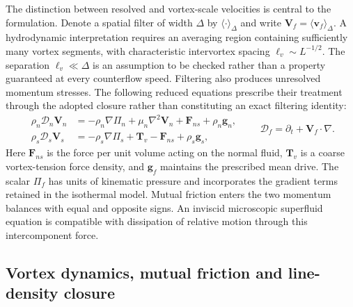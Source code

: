 \documentclass[11pt]{article}
\numberwithin{equation}{section}
\begin{document}
The distinction between resolved and vortex-scale velocities is central to the formulation. Denote a spatial filter of width $\Delta$ by $\langle\cdot\rangle_\Delta$ and write $\mathbf V_f=\langle\mathbf v_f\rangle_\Delta$. A hydrodynamic interpretation requires an averaging region containing sufficiently many vortex segments, with characteristic intervortex spacing $\ell_v\sim L^{-1/2}$. The separation $\ell_v\ll\Delta$ is an assumption to be checked rather than a property guaranteed at every counterflow speed. Filtering also produces unresolved momentum stresses. The following reduced equations prescribe their treatment through the adopted closure rather than constituting an exact filtering identity:
\begin{equation}
 \begin{aligned}
 \rho_n\mathcal D_n\mathbf V_n
 &=-\rho_n\nabla\Pi_n+\mu_n\nabla^2\mathbf V_n
   +\mathbf F_{ns}+\rho_n\mathbf g_n,\\
 \rho_s\mathcal D_s\mathbf V_s
 &=-\rho_s\nabla\Pi_s+\mathbf T_v
   -\mathbf F_{ns}+\rho_s\mathbf g_s,
 \end{aligned}
 \qquad
 \mathcal D_f=\partial_t+\mathbf V_f\cdot\nabla.
 \label{eq:twofluidgeneral}
\end{equation}
Here $\mathbf F_{ns}$ is the force per unit volume acting on the normal fluid, $\mathbf T_v$ is a coarse vortex-tension force density, and $\mathbf g_f$ maintains the prescribed mean drive. The scalar $\Pi_f$ has units of kinematic pressure and incorporates the gradient terms retained in the isothermal model. Mutual friction enters the two momentum balances with equal and opposite signs. An inviscid microscopic superfluid equation is compatible with dissipation of relative motion through this intercomponent force.

\subsection{Vortex dynamics, mutual friction and line-density closure}
\label{sec:vortexclosure}
\end{document}

